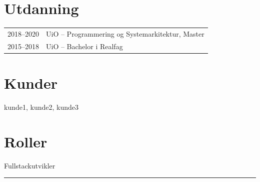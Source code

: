 \documentclass[a4paper,11pt]{article}
\begin{document}
\begin{paracol}{2}
\section{Utdanning}
\begin{tabularx}{\columnwidth}{@{}lX@{}}
2018--2020 & UiO -- Programmering og Systemarkitektur, Master \\
2015--2018 & UiO -- Bachelor i Realfag \\
\end{tabularx}


\section{Kunder}
kunde1, kunde2, kunde3

\section{Roller}
Fullstackutvikler

\end{paracol}

\vfill
\noindent\rule{\linewidth}{0.5pt}\\
\hfill 
\end{document}
